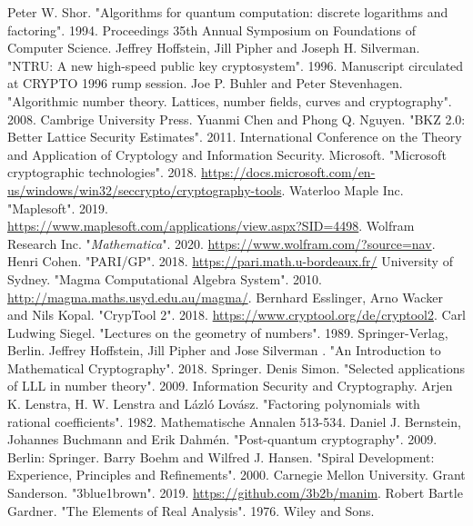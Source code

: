 \documentclass{llncs}
\begin{document}
\begin{thebibliography}{8}
     Peter W. Shor. "Algorithms for quantum computation: discrete logarithms and factoring". 1994. Proceedings 35th Annual Symposium on Foundations of Computer Science.
    Jeffrey Hoffstein, Jill Pipher and Joseph H. Silverman. "NTRU: A new high-speed public key cryptosystem". 1996. Manuscript circulated at CRYPTO 1996 rump session.
	Joe P. Buhler and Peter Stevenhagen. "Algorithmic number theory. Lattices, number fields, curves and cryptography". 2008. Cambrige University Press.
	 Yuanmi Chen and Phong Q. Nguyen. "BKZ 2.0: Better Lattice Security Estimates". 2011. International Conference on the Theory and Application of Cryptology and Information Security.
	Microsoft. "Microsoft cryptographic technologies". 2018. \url{https://docs.microsoft.com/en-us/windows/win32/seccrypto/cryptography-tools}.
	Waterloo Maple Inc. "Maplesoft". 2019. \\ \url{https://www.maplesoft.com/applications/view.aspx?SID=4498}.
	 Wolfram Research Inc. "\textit{Mathematica}". 2020. \url{https://www.wolfram.com/?source=nav}.
	Henri Cohen. "PARI/GP". 2018. \url{https://pari.math.u-bordeaux.fr/}
	University of Sydney. "Magma Computational Algebra System". 2010. \url{http://magma.maths.usyd.edu.au/magma/}.
	 Bernhard Esslinger, Arno Wacker and Nils Kopal. "CrypTool 2". 2018. \url{https://www.cryptool.org/de/cryptool2}.
	Carl Ludwing Siegel. "Lectures on the geometry of numbers". 1989. Springer-Verlag, Berlin.
	Jeffrey Hoffstein, Jill Pipher and Jose Silverman . "An Introduction to Mathematical Cryptography". 2018. Springer.
	Denis Simon. "Selected applications of LLL in number theory". 2009. Information Security and Cryptography.
	Arjen K. Lenstra, H. W. Lenstra and L\'azl\'o Lov\'asz. "Factoring polynomials with rational coefficients". 1982. Mathematische Annalen 513-534.
	Daniel J. Bernstein, Johannes Buchmann and Erik Dahmén. "Post-quantum cryptography". 2009. Berlin: Springer.
	Barry Boehm and Wilfred J. Hansen. "Spiral Development: Experience, Principles and Refinements". 2000. Carnegie Mellon University.
	 Grant Sanderson. "3blue1brown". 2019. \url{https://github.com/3b2b/manim}.
	Robert Bartle Gardner. "The Elements of Real Analysis". 1976. Wiley and Sons.

	
\end{thebibliography}
\end{document}
